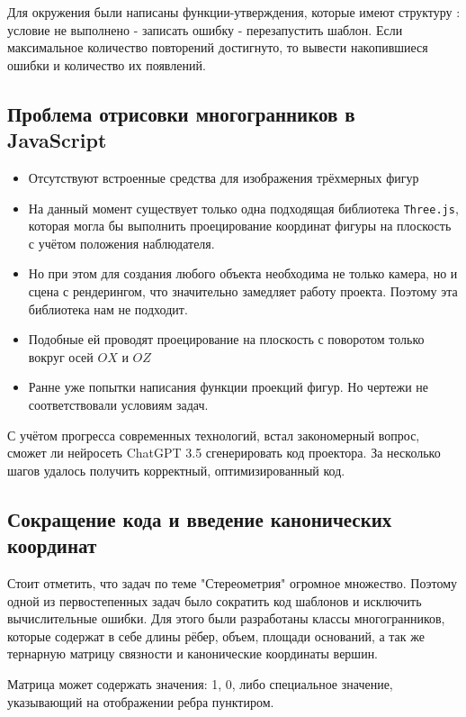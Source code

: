\documentclass[a4paper, 12pt]{extarticle}
\begin{document}
Для окружения были написаны функции-утверждения, которые имеют структуру : условие не выполнено - записать ошибку - перезапустить шаблон. Если максимальное количество повторений достигнуто, то вывести накопившиеся ошибки и количество их появлений. 


\subsection*{Проблема отрисовки многогранников в JavaScript}

\begin{itemize}
	\item Отсутствуют встроенные средства для изображения трёхмерных фигур
	\item На данный момент существует только одна подходящая библиотека \texttt{Three.js}, которая могла бы выполнить проецирование координат фигуры на плоскость с учётом положения наблюдателя.
	\item Но при этом для создания любого объекта необходима не только камера, но и сцена с рендерингом, что значительно замедляет работу проекта. Поэтому эта библиотека нам не подходит.
	\item Подобные ей проводят проецирование на плоскость с поворотом только вокруг осей $OX$ и $OZ$
	\item Ранне уже попытки написания функции проекций фигур. Но чертежи не соответствовали условиям задач.
\end{itemize}

С учётом прогресса современных технологий, встал закономерный вопрос, сможет ли нейросеть ChatGPT 3.5 сгенерировать код проектора.
За несколько шагов удалось получить корректный, оптимизированный код.

\subsection*{Сокращение кода и введение канонических координат}

Стоит отметить, что задач по теме "Стереометрия" огромное множество. Поэтому одной из первостепенных задач было сократить код шаблонов и исключить вычислительные ошибки. Для этого были разработаны классы многогранников, которые содержат в себе длины рёбер, объем, площади оснований, а так же тернарную матрицу связности и канонические координаты вершин.

Матрица может содержать значения: 1, 0, либо специальное значение, указывающий на отображении ребра пунктиром.
\end{document}
